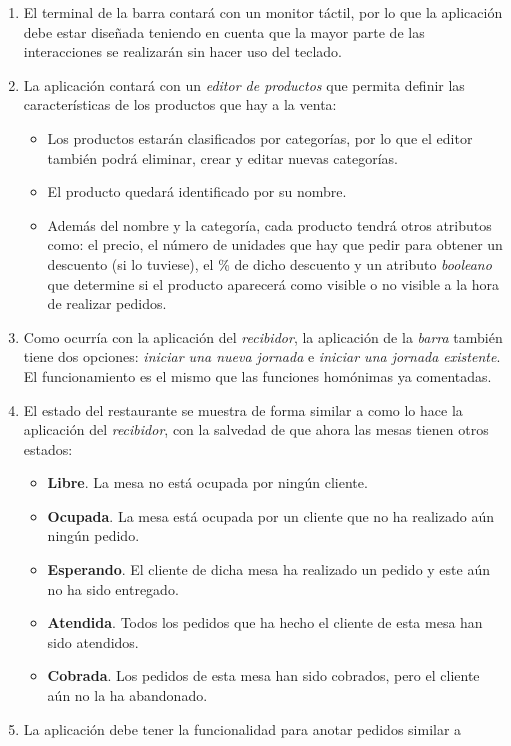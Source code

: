 \begin{enumerate}
\item El terminal de la barra contará con un monitor táctil, por lo que la
aplicación debe estar diseñada teniendo en cuenta que la mayor parte de las
interacciones se realizarán sin hacer uso del teclado.
\item La aplicación contará con un \emph{editor de productos} que permita
definir las características de los productos que hay a la venta:
  \begin{itemize}
  \item Los productos estarán clasificados por categorías, por lo que el
  editor también podrá eliminar, crear y editar nuevas categorías.
  \item El producto quedará identificado por su nombre.
  \item Además del nombre y la categoría, cada producto tendrá otros atributos
  como: el precio, el número de unidades que hay que pedir para obtener un
  descuento (si lo tuviese), el \% de dicho descuento y un atributo
  \emph{booleano} que determine si el producto aparecerá como visible o no
  visible a la hora de realizar pedidos.
  \end{itemize}
\item Como ocurría con la aplicación del \emph{recibidor}, la aplicación de la
\emph{barra} también tiene dos opciones: \emph{iniciar una nueva jornada} e
\emph{iniciar una jornada existente}. El funcionamiento es el mismo que las
funciones homónimas ya comentadas.
\item El estado del restaurante se muestra de forma similar a como lo hace
la aplicación del \emph{recibidor}, con la salvedad de que ahora las mesas
tienen otros estados:
  \begin{itemize}
  \item \textbf{Libre}. La mesa no está ocupada por ningún cliente.
  \item \textbf{Ocupada}. La mesa está ocupada por un cliente que no ha
  realizado aún ningún pedido.
  \item \textbf{Esperando}. El cliente de dicha mesa ha realizado un pedido y
  este aún no ha sido entregado.
  \item \textbf{Atendida}. Todos los pedidos que ha hecho el cliente de esta
  mesa han sido atendidos.
  \item \textbf{Cobrada}. Los pedidos de esta mesa han sido cobrados, pero el
  cliente aún no la ha abandonado.
  \end{itemize}
\item La aplicación debe tener la funcionalidad para anotar pedidos similar a 

\end{enumerate}
